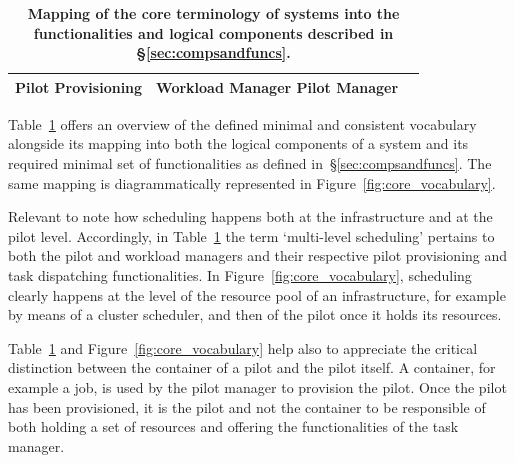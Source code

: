\documentclass{sig-alternate}
\begin{document}
\begin{table}
\begin{tabular}{|p{4cm}|p{3.2cm}|p{3.2cm}|}
      \textcolor{funct}{Pilot Provisioning} &
    \textcolor{lcomp}{Workload Manager} \newline
      \textcolor{lcomp}{Pilot Manager} \\
  \hline
 \end{tabular}
 \caption{\textbf{Mapping of the core terminology of \pilot systems into the
     functionalities and logical components described in
     \S\ref{sec:compsandfuncs}.}
     }
 \label{table:terminology}
\end{table}

Table~\ref{table:terminology} offers an overview of the defined minimal and
consistent vocabulary alongside its mapping into both the logical components of
a \pilot system and its required minimal set of functionalities as defined
in~\S\ref{sec:compsandfuncs}. The same mapping is diagrammatically represented
in Figure~\ref{fig:core_vocabulary}.

Relevant to note how scheduling happens both at the infrastructure and at the
pilot level. Accordingly, in Table~\ref{table:terminology} the term
`multi-level scheduling' pertains to both the pilot and workload managers and
their respective pilot provisioning and task dispatching functionalities. In
Figure~\ref{fig:core_vocabulary}, scheduling clearly happens at the level of
the resource pool of an infrastructure, for example by means of a cluster
scheduler, and then of the pilot once it holds its resources.

Table~\ref{table:terminology} and  Figure~\ref{fig:core_vocabulary} help also
to appreciate the critical distinction between the container of a pilot and the
pilot itself. A container, for example a job, is used by the pilot manager to
provision the pilot. Once the pilot has been provisioned, it is the pilot and
not the container to be responsible of both holding a set of resources and
offering the functionalities of the task manager.
\end{document}
